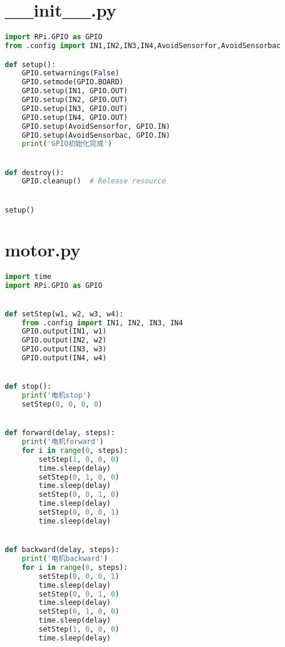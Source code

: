 \section{\_\_init\_\_.py}\label{apdx:__init__.py}
\begin{lstlisting}[language=python]
import RPi.GPIO as GPIO
from .config import IN1,IN2,IN3,IN4,AvoidSensorfor,AvoidSensorbac

def setup():
    GPIO.setwarnings(False)
    GPIO.setmode(GPIO.BOARD)
    GPIO.setup(IN1, GPIO.OUT)
    GPIO.setup(IN2, GPIO.OUT)
    GPIO.setup(IN3, GPIO.OUT)
    GPIO.setup(IN4, GPIO.OUT)
    GPIO.setup(AvoidSensorfor, GPIO.IN)
    GPIO.setup(AvoidSensorbac, GPIO.IN)
    print('GPIO初始化完成')


def destroy():
    GPIO.cleanup()  # Release resource


setup()
\end{lstlisting}

\section{motor.py}\label{apdx:motor.py}
\begin{lstlisting}[language=python]
import time
import RPi.GPIO as GPIO


def setStep(w1, w2, w3, w4):
    from .config import IN1, IN2, IN3, IN4
    GPIO.output(IN1, w1)
    GPIO.output(IN2, w2)
    GPIO.output(IN3, w3)
    GPIO.output(IN4, w4)


def stop():
    print('电机stop')
    setStep(0, 0, 0, 0)


def forward(delay, steps):
    print('电机forward')
    for i in range(0, steps):
        setStep(1, 0, 0, 0)
        time.sleep(delay)
        setStep(0, 1, 0, 0)
        time.sleep(delay)
        setStep(0, 0, 1, 0)
        time.sleep(delay)
        setStep(0, 0, 0, 1)
        time.sleep(delay)


def backward(delay, steps):
    print('电机backward')
    for i in range(0, steps):
        setStep(0, 0, 0, 1)
        time.sleep(delay)
        setStep(0, 0, 1, 0)
        time.sleep(delay)
        setStep(0, 1, 0, 0)
        time.sleep(delay)
        setStep(1, 0, 0, 0)
		time.sleep(delay)
\end{lstlisting}

